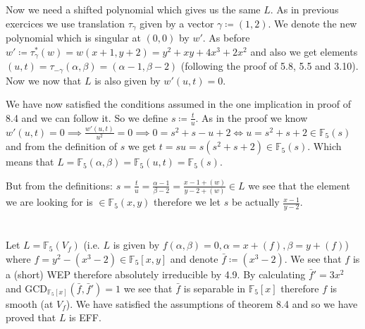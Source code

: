 \documentclass[12pt, a4paper]{article}
\begin{document}
Now we need a shifted polynomial which gives us the same $L$. As in previous exercices we use translation $\tau_\gamma$ given by a vector $\gamma \coloneqq (1,2)$. We denote the new polynomial which is singular at $(0,0)$ by $w'$. As before $w' \coloneqq \tau_{\gamma}^*(w) = w(x+1,y+2) = y^2+xy+4x^3+2x^2$ and also we get elements $(u,t) = \tau_{-\gamma}(\alpha,\beta) = (\alpha-1,\beta-2)$ (following the proof of 5.8, 5.5 and 3.10). Now we now that $L$ is also given by $w'(u,t)=0$.

We have now satisfied the conditions assumed in the one implication in proof of 8.4 and we can follow it. So we define $s \coloneqq \frac{t}{u}$. As in the proof we know $w'(u,t)=0 \implies \frac{w'(u,t)}{u^2} = 0 \implies 0 = s^2+s-u+2 \iff u = s^2+s+2 \in \mathbb{F}_5(s)$ and from the definition of $s$ we get $t = su = s(s^2+s+2)\in \mathbb{F}_5(s)$. Which means that $L = \mathbb{F}_5(\alpha,\beta)=\mathbb{F}_5(u,t) = \mathbb{F}_5(s)$. 

But from the definitions: $s = \frac{t}{u} = \frac{\alpha-1}{\beta-2} = \frac{x-1 + (w)}{y-2 + (w)} \in L$ we see that the element we are looking for is $\in \mathbb{F}_5(x,y)$ therefore we let $s$ be actually $\frac{x-1}{y-2}$.

\section{}
Let $L = \mathbb{F}_5(V_f)$ (i.e. $L$ is given by $f(\alpha,\beta)=0, \alpha = x+(f), \beta= y +(f) $) where $f = y^2-(x^3-2) \in \mathbb{F}_5[x,y]$ and denote $\bar{f} \coloneqq (x^3-2)$. We see that $f$ is a (short) WEP therefore absolutely irreducible by 4.9. By calculating $\bar{f}' = 3x^2$ and $\text{GCD}_{\mathbb{F}_5[x]}(\bar{f},\bar{f}') = 1$ we see that $\bar{f}$ is separable in $\mathbb{F}_5[x]$ therefore $f$ is smooth (at $V_f$). We have satisfied the assumptions of theorem 8.4 and so we have proved that $L$ is EFF. 
\end{document}
